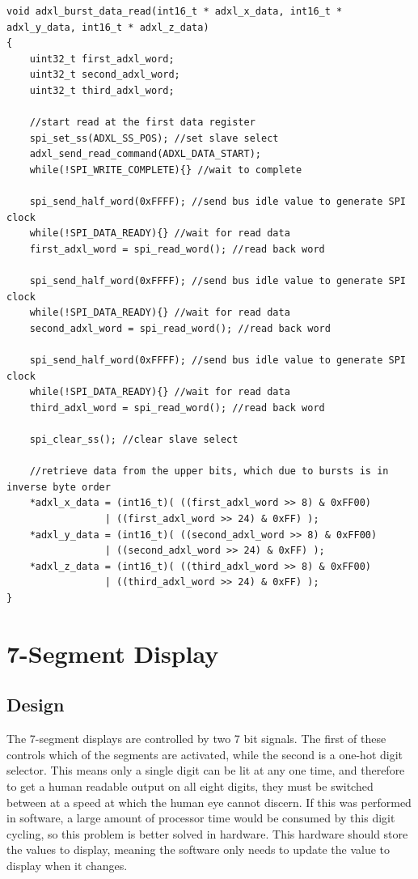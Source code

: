 \documentclass[11pt,british]{report}
\begin{document}
\begin{lstlisting}[style={c-style}]
void adxl_burst_data_read(int16_t * adxl_x_data, int16_t * adxl_y_data, int16_t * adxl_z_data)
{
	uint32_t first_adxl_word;
	uint32_t second_adxl_word;
	uint32_t third_adxl_word;
	
	//start read at the first data register
	spi_set_ss(ADXL_SS_POS); //set slave select
	adxl_send_read_command(ADXL_DATA_START);
	while(!SPI_WRITE_COMPLETE){} //wait to complete
	
	spi_send_half_word(0xFFFF); //send bus idle value to generate SPI clock
	while(!SPI_DATA_READY){} //wait for read data
	first_adxl_word = spi_read_word(); //read back word
	
	spi_send_half_word(0xFFFF); //send bus idle value to generate SPI clock
	while(!SPI_DATA_READY){} //wait for read data
	second_adxl_word = spi_read_word(); //read back word
	
	spi_send_half_word(0xFFFF); //send bus idle value to generate SPI clock
	while(!SPI_DATA_READY){} //wait for read data
	third_adxl_word = spi_read_word(); //read back word

	spi_clear_ss(); //clear slave select  
		
	//retrieve data from the upper bits, which due to bursts is in inverse byte order
	*adxl_x_data = (int16_t)( ((first_adxl_word >> 8) & 0xFF00)
	             | ((first_adxl_word >> 24) & 0xFF) );			
	*adxl_y_data = (int16_t)( ((second_adxl_word >> 8) & 0xFF00)
	             | ((second_adxl_word >> 24) & 0xFF) );
	*adxl_z_data = (int16_t)( ((third_adxl_word >> 8) & 0xFF00)
	             | ((third_adxl_word >> 24) & 0xFF) );   
}
\end{lstlisting}

\section*{7-Segment Display}
\subsection*{Design}

The 7-segment displays are controlled by two 7 bit signals. The first of these controls which of the segments are activated, while the second is a one-hot digit selector. This means only a single digit can be lit at any one time, and therefore to get a human readable output on all eight digits, they must be switched between at a speed at which the human eye cannot discern. If this was performed in software, a large amount of processor time would be consumed by this digit cycling, so this problem is better solved in hardware. This hardware should store the values to display, meaning the software only needs to update the value to display when it changes.
\end{document}
